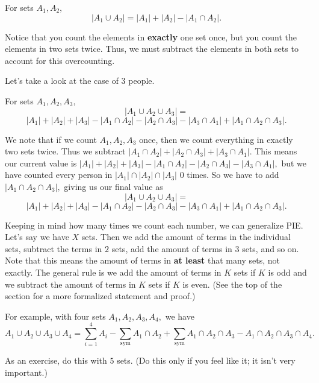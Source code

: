 \begin{theo}
For sets $A_1,A_2,$
\[|A_1\cup A_2|=|A_1|+|A_2|-|A_1\cap A_2|.\]
\end{theo}

\begin{pro}
Notice that you count the elements in \textbf{exactly} one set once, but you count the elements in two sets twice. Thus, we must subtract the elements in both sets to account for this overcounting.
\end{pro}

Let's take a look at the case of $3$ people.

\begin{theo}
For sets $A_1,A_2,A_3,$
\[|A_1\cup A_2\cup A_3|=\]
\[|A_1|+|A_2|+|A_3|-|A_1\cap A_2|-|A_2\cap A_3|- |A_3\cap A_1|+|A_1\cap A_2\cap A_3|.\]
\end{theo}

\begin{pro}
We note that if we count $A_1,A_2,A_3$ once, then we count everything in exactly two sets twice. Thus we subtract $|A_1\cap A_2|+|A_2\cap A_3|+|A_3\cap A_1|.$ This means our current value is $|A_1|+|A_2|+|A_3|-|A_1\cap A_2|-|A_2\cap A_3|- |A_3\cap A_1|,$ but we have counted every person in $|A_1|\cap |A_2|\cap |A_3|$ $0$ times. So we have to add $|A_1\cap A_2\cap A_3|,$ giving us our final value as
$$|A_1\cup A_2\cup A_3|=$$
$$|A_1|+|A_2|+|A_3|-|A_1\cap A_2|-|A_2\cap A_3|- |A_3\cap A_1|+|A_1\cap A_2\cap A_3|.$$
\end{pro}

Keeping in mind how many times we count each number, we can generalize PIE. Let's say we have $X$ sets. Then we add the amount of terms in the individual sets, subtract the terms in $2$ sets, add the amount of terms in $3$ sets, and so on. Note that this means the amount of terms in \textbf{at least} that many sets, not exactly. The general rule is we add the amount of terms in $K$ sets if $K$ is odd and we subtract the amount of terms in $K$ sets if $K$ is even. (See the top of the section for a more formalized statement and proof.)

For example, with four sets $A_1,A_2,A_3,A_4,$ we have $$A_1\cup A_2\cup A_3\cup A_4=\sum\limits_{i=1}^{4}A_i-\sum\limits_{\text{sym}}A_1\cap A_2+\sum\limits_{\text{sym}}A_1\cap A_2\cap A_3-A_1\cap A_2\cap A_3 \cap A_4.$$

As an exercise, do this with $5$ sets. (Do this only if you feel like it; it isn't very important.)

